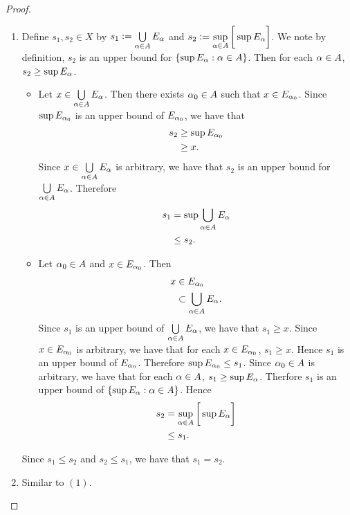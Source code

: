 \documentclass{book}
\begin{document}
	\begin{proof}\
		\begin{enumerate}
			\item Define $s_1, s_2 \in X$ by $s_1 \vcentcolon= \bigcup\limits_{\alpha \in A} E_{\alpha}$ and $s_2 \vcentcolon= \sup\limits_{\alpha \in A} \bigg[ \sup E_{\alpha} \bigg]$. We note by definition, $s_2$ is an upper bound for $\{\sup E_{\alpha}: \alpha \in A\}$. Then for each $\alpha \in A$, $s_2 \geq \sup E_{\alpha}$. 
			\begin{itemize}
				\item Let $x \in \bigcup\limits_{\alpha \in A} E_{\alpha}$. Then there exists $\alpha_0 \in A$ such that $x \in E_{\alpha_0}$. Since $\sup E_{\alpha_0}$ is an upper bound of $E_{\alpha_0}$, we have that 
				\begin{align*}
					s_2
					& \geq \sup E_{\alpha_0} \\
					& \geq x.
				\end{align*}
				Since $x \in \bigcup\limits_{\alpha \in A} E_{\alpha}$ is arbitrary, we have that $s_2$ is an upper bound for $\bigcup\limits_{\alpha \in A} E_{\alpha}$. Therefore
				\begin{align*}
					s_1
					& = \sup \bigcup\limits_{\alpha \in A} E_{\alpha} \\
					& \leq s_2.
				\end{align*}   
				\item Let $\alpha_0 \in A$ and $x \in E_{\alpha_0}$. Then 
				\begin{align*}
					x
					& \in E_{\alpha_0} \\
					& \subset \bigcup\limits_{\alpha \in A} E_{\alpha}.
				\end{align*}
				Since $s_1$ is an upper bound of $\bigcup\limits_{\alpha \in A} E_{\alpha}$, we have that $s_1 \geq x$. Since $x \in E_{\alpha_0}$ is arbitrary, we have that for each $x \in E_{\alpha_0}$, $s_1 \geq x$. Hence $s_1$ is an upper bound of $E_{\alpha_0}$. Therefore $\sup E_{\alpha_0} \leq s_1$. Since $\alpha_0 \in A$ is arbitrary, we have that for each $\alpha \in A$, $s_1 \geq \sup E_{\alpha}$. Therfore $s_1$ is an upper bound of $\{\sup E_{\alpha}: \alpha \in A\}$. Hence 
				\begin{align*}
					s_2
					& = \sup\limits_{\alpha \in A} \bigg[ \sup E_{\alpha} \bigg] \\
					& \leq s_1. 
				\end{align*}
			\end{itemize}
			Since $s_1 \leq s_2$ and $s_2 \leq s_1$, we have that $s_1 = s_2$. 
			\item Similar to $(1)$. 
		\end{enumerate}
	\end{proof}
	
\end{document}
